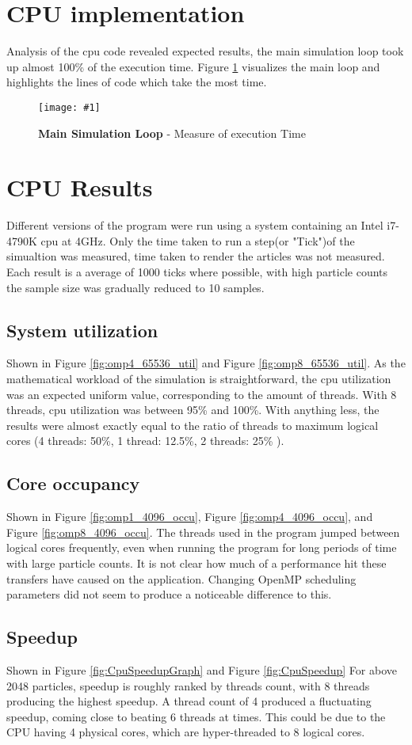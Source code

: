 \documentclass[conference]{acmsiggraph}
\newcommand{\figuremacroW}[4]{
	\begin{figure}[h] %
		\centering
		\texttt{[image: \#1]}
		\caption[#2]{\textbf{#2} - #3}
		\label{fig:#1}
	\end{figure}
}
\begin{document}
\section{CPU implementation}
Analysis of the cpu code revealed expected results, the main simulation loop took up almost 100\% of the execution time. Figure \ref{fig:HotCode} visualizes the main loop and highlights the lines of code which take the most time.

\figuremacroW
{HotCode}
{Main Simulation Loop}
{Measure of execution Time}
{1.0}

\section{CPU Results}
Different versions of the program were run using a system containing an Intel i7-4790K cpu at 4GHz. Only the time taken to run a step(or "Tick")of the simualtion was measured, time taken to render the articles was not measured. Each result is a average of 1000 ticks where possible, with high particle counts the sample size was gradually reduced to 10 samples.

\subsection{System utilization}
Shown in Figure \ref{fig:omp4_65536_util} and Figure \ref{fig:omp8_65536_util}.
As the mathematical workload of the simulation is straightforward, the cpu utilization was an expected uniform value, corresponding to the amount of threads. With 8 threads, cpu utilization was between 95\% and 100\%. With anything less, the results were almost exactly equal to the ratio of threads to maximum logical cores (4 threads: 50\%, 1 thread: 12.5\%, 2 threads: 25\% ).

\subsection{Core occupancy}
Shown in Figure \ref{fig:omp1_4096_occu}, Figure \ref{fig:omp4_4096_occu}, and Figure \ref{fig:omp8_4096_occu}.
The threads used in the program jumped between logical cores frequently, even when running the program for long periods of time with large particle counts. It is not clear how much of a performance hit these transfers have caused on the application. Changing OpenMP scheduling parameters did not seem to produce a noticeable difference to this.

\subsection{Speedup}
Shown in Figure \ref{fig:CpuSpeedupGraph} and Figure \ref{fig:CpuSpeedup}
For above 2048 particles, speedup is roughly ranked by threads count, with 8 threads producing the highest speedup. A thread count of 4 produced a fluctuating speedup, coming close to beating 6 threads at times. This could be due to the CPU having 4 physical cores, which are hyper-threaded to 8 logical cores.
\end{document}
